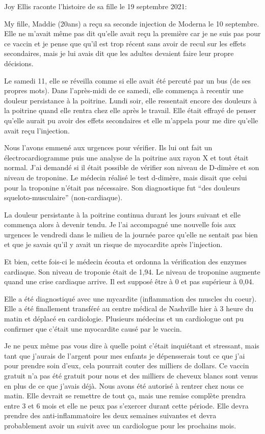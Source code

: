 Joy Ellis raconte l'histoire de sa fille le 19 septembre 2021:

My fille, Maddie (20ans) a reçu sa seconde injection de Moderna le 10
septembre. Elle ne m'avait même pas dit qu'elle avait reçu la première car je ne
suis pas pour ce vaccin et je pense que qu'il est trop récent sans avoir de
recul sur les effets secondaires, mais je lui avais dit que les adultes devaient
faire leur propre décisions.

Le samedi 11, elle se réveilla comme si elle avait été percuté par un bus (de
ses propres mots). Dans l'après-midi de ce samedi, elle commença à recentir une
douleur persistance à la poitrine. Lundi soir, elle ressentait encore des
douleurs à la poitrine quand elle rentra chez elle après le travail. Elle était
effrayé de penser qu'elle aurait pu avoir des effets secondaires et elle
m'appela pour me dire qu'elle avait reçu l'injection.

Nous l'avons emmené aux urgences pour vérifier. Ils lui ont fait un
électrocardiogramme puis une analyse de la poitrine aux rayon X et tout était
normal. J'ai demandé si il était possible de vérifier son niveau de D-dimère et
son niveau de troponine. Le médecin réalisé le test d-dimère, mais disait que
celui pour la troponine n'était pas nécessaire. Son diagnostique fut “des
douleurs squeloto-musculaire” (non-cardiaque).

La douleur persistante à la poitrine continua durant les jours suivant et elle
commença alors à devenir tendu. Je l'ai accompagné une nouvelle fois aux
urgences le vendredi dans le milieu de la journée parce qu'elle ne sentait pas
bien et que je savais qu'il y avait un risque de myocardite après l'injection.

Et bien, cette fois-ci le médecin écouta et ordonna la vérification des enzymes
cardiaque. Son niveau de troponie était de 1,94. Le niveau de troponine augmente
quand une crise cardiaque arrive. Il est supposé être à 0 et pas supérieur à
0,04.

Elle a été diagnostiqué avec une mycardite (inflammation des muscles du
coeur). Elle a été finallement transféré au centre médical de Nashville hier à 3
heure du matin et déplacé en cardiologie. Plusieurs médecins et un cardiologue
ont pu confirmer que c'était une myocardite causé par le vaccin.

Je ne peux même pas vous dire à quelle point c'était inquiétant et stressant,
mais tant que j'aurais de l'argent pour mes enfants je dépensserais tout ce que
j'ai pour prendre soin d'eux, cela pourrait couter des milliers de dollars. Ce
vaccin gratuit n'a pas été gratuit pour nous et des milliers de cheveux blancs
sont venus en plus de ce que j'avais déjà. Nous avons été autorisé à rentrer
chez nous ce matin. Elle devrait se remettre de tout ça, mais une remise
complète prendra entre 3 et 6 mois et elle ne peux pas s'exercer durant cette
période. Elle devra prendre des anti-inflammatoire les deux semaines suivantes
et devra probablement avoir un suivit avec un cardiologue pour les prochains
mois.

